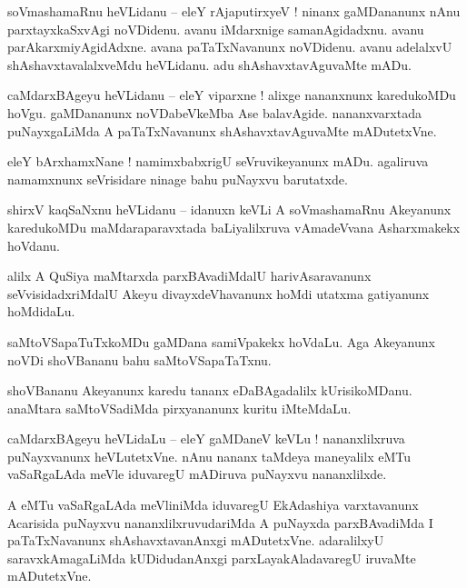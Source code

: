 \documentclass{article}
\begin{document}
\begin{mn}%
soVmashamaRnu heVLidanu -- eleY rAjaputirxyeV ! ninanx gaMDananunx nAnu parxtayxkaSxvAgi noVDidenu. 
avanu iMdarxnige samanAgidadxnu. avanu parAkarxmiyAgidAdxne. avana paTaTxNavanunx noVDidenu. avanu 
adelalxvU shAshavxtavalalxveMdu heVLidanu. adu shAshavxtavAguvaMte mADu.
\end{mn}

\begin{mn}%
caMdarxBAgeyu heVLidanu -- eleY viparxne ! alixge nananxnunx karedukoMDu hoVgu. gaMDananunx 
noVDabeVkeMba Ase balavAgide. nananxvarxtada puNayxgaLiMda A paTaTxNavanunx shAshavxtavAguvaMte 
mADutetxVne.
\end{mn}

\begin{mn}%
eleY bArxhamxNane ! namimxbabxrigU seVruvikeyanunx mADu. agaliruva namamxnunx seVrisidare ninage 
bahu puNayxvu barutatxde.
\end{mn}

\begin{mn}%
shirxV kaqSaNxnu heVLidanu -- idanuxn keVLi A soVmashamaRnu Akeyanunx karedukoMDu maMdaraparavxtada 
baLiyalilxruva vAmadeVvana Asharxmakekx hoVdanu.
\end{mn}

\begin{mn}%
alilx A QuSiya maMtarxda parxBAvadiMdalU harivAsaravanunx seVvisidadxriMdalU Akeyu 
divayxdeVhavanunx hoMdi utatxma gatiyanunx hoMdidaLu.
\end{mn}

\begin{mn}%
saMtoVSapaTuTxkoMDu gaMDana samiVpakekx hoVdaLu. Aga Akeyanunx noVDi shoVBananu bahu saMtoVSapaTaTxnu.
\end{mn}

\begin{mn}%
shoVBananu Akeyanunx karedu tananx eDaBAgadalilx kUrisikoMDanu. anaMtara saMtoVSadiMda pirxyananunx 
kuritu iMteMdaLu.
\end{mn}

\begin{mn}%
caMdarxBAgeyu heVLidaLu -- eleY gaMDaneV keVLu ! nananxlilxruva puNayxvanunx heVLutetxVne. nAnu 
nananx taMdeya maneyalilx eMTu vaSaRgaLAda meVle iduvaregU mADiruva puNayxvu nananxlilxde.
\end{mn}

\begin{mn}%
A eMTu vaSaRgaLAda meVliniMda iduvaregU EkAdashiya varxtavanunx Acarisida puNayxvu 
nananxlilxruvudariMda A puNayxda parxBAvadiMda I paTaTxNavanunx shAshavxtavanAnxgi mADutetxVne. 
adaralilxyU saravxkAmagaLiMda kUDidudanAnxgi parxLayakAladavaregU iruvaMte mADutetxVne.
\end{mn}
\end{document}
